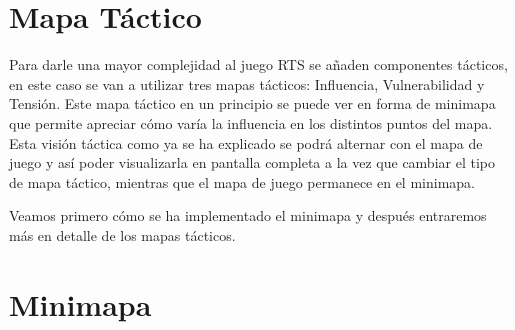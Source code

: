 \section{Mapa Táctico}
Para darle una mayor complejidad al juego RTS se añaden componentes tácticos, en este caso se van a utilizar tres mapas tácticos: Influencia, Vulnerabilidad y Tensión. Este mapa táctico en un principio se puede ver en forma de minimapa que permite apreciar cómo varía la influencia en los distintos puntos del mapa. Esta visión táctica como ya se ha explicado se podrá alternar con el mapa de juego y así poder visualizarla en pantalla completa a la vez que cambiar el tipo de mapa táctico, mientras que el mapa de juego permanece en el minimapa.

Veamos primero cómo se ha implementado el minimapa y después entraremos más en detalle de los mapas tácticos.
\section{Minimapa}
